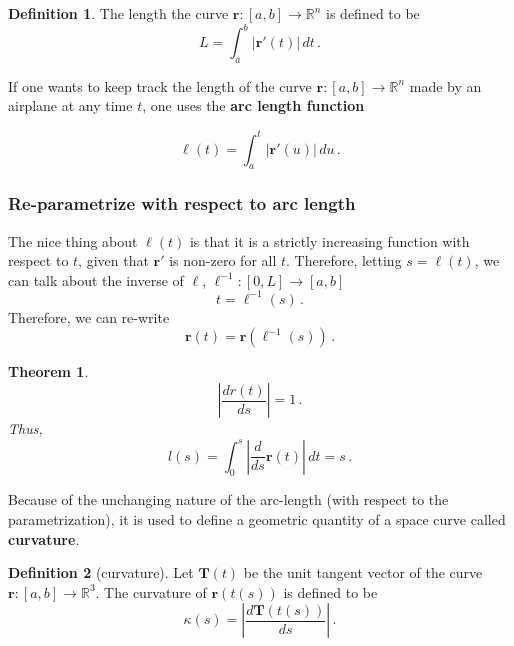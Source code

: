 \documentclass[
]{book}
\newtheorem{theorem}{Theorem}[chapter]
\theoremstyle{definition}
\newtheorem{definition}{Definition}[chapter]
\theoremstyle{definition}
\theoremstyle{definition}
\theoremstyle{definition}
\theoremstyle{remark}
\begin{document}
\begin{definition}
The length the curve \(\mathbf{r}:[a,b] \to \mathbb{R}^n\) is defined to be
\begin{equation*}
L = \int_a^b \left| \mathbf{r}'(t) \right| \, dt \,.
\end{equation*}
\end{definition}

If one wants to keep track the length of the curve \(\mathbf{r}:[a,b] \to \mathbb{R}^n\) made by an airplane
at any time \(t\), one uses the \textbf{arc length function}

\begin{equation*}
    \ell(t) = \int_a^t \left| \mathbf{r}'(u) \right| \, du \,.
\end{equation*}

\hypertarget{re-parametrize-with-respect-to-arc-length}{%
\subsubsection*{Re-parametrize with respect to arc length}\label{re-parametrize-with-respect-to-arc-length}}


The nice thing about \(\ell(t)\) is that it is a strictly increasing function with respect to \(t\),
given that \(\mathbf{r}'\) is non-zero for all \(t\).
Therefore, letting \(s = \ell(t)\), we can talk about the inverse of \(\ell\), \(\ell^{-1}:[0,L] \to [a,b]\)
\begin{equation*}
    t = \ell^{-1}(s) \,.
\end{equation*}
Therefore, we can re-write
\begin{equation*}
\mathbf{r}(t) = \mathbf{r}(\ell^{-1}(s)) \,.
\end{equation*}

\begin{theorem}
\[\left| \frac{d r(t)}{ds} \right| = 1 \,.\]
Thus,
\[l(s) = \int_0^s \left| \frac{d}{ds} \mathbf{r}(t) \right| \, dt = s \,.\]
\end{theorem}

Because of the unchanging nature of the arc-length (with respect to the
parametrization),
it is used to define a geometric quantity of a space curve called \textbf{curvature}.

\begin{definition}[curvature]
Let \(\mathbf{T}(t)\) be the unit tangent vector of the curve \(\mathbf{r}:[a,b] \to \mathbb{R}^3\).
The curvature of \(\mathbf{r}(t(s))\) is defined to be
\begin{equation*}
    \kappa(s) = \left| \frac{d \mathbf{T}(t(s))}{ds}\right| \,.
\end{equation*}
\end{definition}
\end{document}
